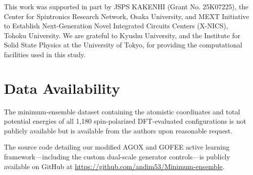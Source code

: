 
\begin{acknowledgments}
This work was supported in part by JSPS KAKENHI (Grant No. 25K07225), the Center for Spintronics Research Network, Osaka University, and MEXT Initiative to Establish Next-Generation Novel Integrated Circuits Centers (X-NICS), Tohoku University. We are grateful to Kyushu University, and the Institute for Solid State Physics at the University of Tokyo, for providing the computational facilities used in this study.
\end{acknowledgments}

\section*{Data Availability}
The minimum-ensemble dataset containing the atomistic coordinates and total potential energies of all 1,180 spin-polarized DFT-evaluated configurations is not publicly available but is available from the authors upon reasonable request.

The source code detailing our modified AGOX and GOFEE active learning framework—including the custom dual-scale generator controls—is publicly available on GitHub at \url{https://github.com/andim53/Minimum-ensemble}.